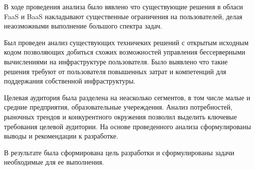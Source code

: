 В ходе проведения анализа было вявлено что существующие решения в обласи FaaS и BaaS накладывают существенные ограничения на пользователей, делая неаозможными выполнение большого спектра задач.

Был проведен анализ существующих техничеких решений с открытым исходным кодом позволяющих добиться схожих возможностей управления бессерверными вычислениями на инфраструктуре пользователя. Было выявлено что такие решения требуют от пользователя повышенных затрат и компетенций для поддержания собственной инфраструктуры.

Целевая аудитория была разделена на неасколько сегментов, в том числе малые и средние предприятия, образовательные учереждения.
Анализ потребностей, рыночных трендов и конкурентного окружения позволил выделить ключевые требования целевой аудитории. На основе проведенного анализа сформулированы выводы и рекомендации к разработке.

В результате была сформирована цель разработки и сформулированы задачи необходимые для ее выполнения.


